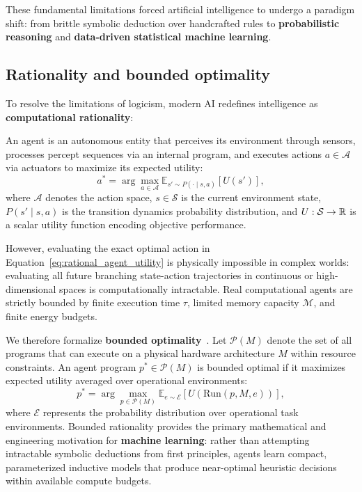 These fundamental limitations forced artificial intelligence to undergo a paradigm shift: from brittle symbolic deduction over handcrafted rules to \textbf{probabilistic reasoning} and \textbf{data-driven statistical machine learning}.

\subsection{Rationality and bounded optimality}
\label{sec:computational_rationality}

To resolve the limitations of logicism, modern AI redefines intelligence as \textbf{computational rationality}:
\begin{definition}
An agent is an autonomous entity that perceives its environment through sensors, processes percept sequences via an internal program, and executes actions $a \in \mathcal{A}$ via actuators to maximize its expected utility:
\begin{equation}
a^* = \arg\max_{a \in \mathcal{A}} \mathbb{E}_{s' \sim P(\cdot \mid s, a)} \left[ U(s') \right],
\label{eq:rational_agent_utility}
\end{equation}
where $\mathcal{A}$ denotes the action space, $s \in \mathcal{S}$ is the current environment state, $P(s' \mid s, a)$ is the transition dynamics probability distribution, and $U: \mathcal{S} \to \mathbb{R}$ is a scalar utility function encoding objective performance.
\end{definition}

However, evaluating the exact optimal action in Equation~\eqref{eq:rational_agent_utility} is physically impossible in complex worlds: evaluating all future branching state-action trajectories in continuous or high-dimensional spaces is computationally intractable. Real computational agents are strictly bounded by finite execution time $\tau$, limited memory capacity $\mathcal{M}$, and finite energy budgets.

We therefore formalize \textbf{bounded optimality}~\cite{russell2020artificial}. Let $\mathcal{P}(M)$ denote the set of all programs that can execute on a physical hardware architecture $M$ within resource constraints. An agent program $p^* \in \mathcal{P}(M)$ is bounded optimal if it maximizes expected utility averaged over operational environments:
\begin{equation}
p^* = \arg\max_{p \in \mathcal{P}(M)} \mathbb{E}_{e \sim \mathcal{E}} \left[ U(\mathrm{Run}(p, M, e)) \right],
\label{eq:bounded_optimality_formula}
\end{equation}
where $\mathcal{E}$ represents the probability distribution over operational task environments. Bounded rationality provides the primary mathematical and engineering motivation for \textbf{machine learning}: rather than attempting intractable symbolic deductions from first principles, agents learn compact, parameterized inductive models that produce near-optimal heuristic decisions within available compute budgets.

